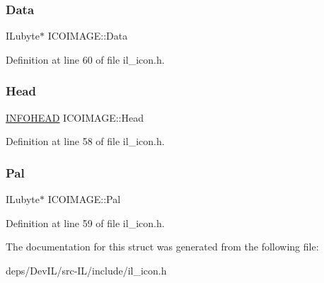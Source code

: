 \subsubsection{\texorpdfstring{Data}{Data}}
{\footnotesize\ttfamily I\+Lubyte$\ast$ I\+C\+O\+I\+M\+A\+G\+E\+::\+Data}



Definition at line 60 of file il\+\_\+icon.\+h.

\mbox{\label{structICOIMAGE_a50b0b3c3e61da6b77c3bad60c73e6002}} 
\subsubsection{\texorpdfstring{Head}{Head}}
{\footnotesize\ttfamily \hyperlink{structINFOHEAD}{I\+N\+F\+O\+H\+E\+AD} I\+C\+O\+I\+M\+A\+G\+E\+::\+Head}



Definition at line 58 of file il\+\_\+icon.\+h.

\mbox{\label{structICOIMAGE_a8f4c1790c54d72e422d6da15a402cd54}} 
\subsubsection{\texorpdfstring{Pal}{Pal}}
{\footnotesize\ttfamily I\+Lubyte$\ast$ I\+C\+O\+I\+M\+A\+G\+E\+::\+Pal}



Definition at line 59 of file il\+\_\+icon.\+h.



The documentation for this struct was generated from the following file\+:\begin{DoxyCompactItemize}
\item 
deps/\+Dev\+I\+L/src-\/\+I\+L/include/il\+\_\+icon.\+h\end{DoxyCompactItemize}
